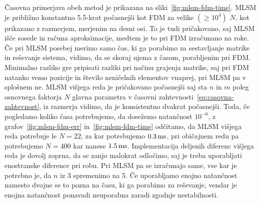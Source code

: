 \documentclass[a4paper,twoside]{article}
\theoremstyle{definition} %
\theoremstyle{plain} %
\numberwithin{equation}{section}
\begin{document}
Časovna primerjava obeh metod je prikazana na sliki~\ref{fig:mlsm-fdm-time}.
MLSM je približno konstantno 5.5-krat počasnejši kot FDM za velike $(\geq
10^4)$ $N$, kot prikazano z razmerjem, merjenim na desni osi. To je tudi
pričakovano, saj MLSM išče sosede in računa aproksimacije, medtem je to pri FDM
izračunano na roke.  Če pri MLSM posebej merimo samo čas, ki ga porabimo za
sestavljanje matrike in reševanje sistema, vidimo, da se skoraj ujema z časom,
porabljenim pri FDM.  Minimalno razliko gre pripisati razliki pri načinu
grajenja matrike, saj pri FDM natanko vemo pozicije in število neničelnih
elementov vnaprej, pri MLSM pa v splošnem ne. MLSM višjega reda je pričakovano
počasnejši saj sta $n$ in $m$ poleg osnovnega faktorja $N$ glavna parametra v
časovni zahtevnosti~\eqref{eq:casovna-zahtevnost}, iz razmerja vidimo, da je
konsistentno dvakrat počasnejši. Toda, če pogledamo koliko časa potrebujemo, da
dosežemo natančnost $10^{-6}$, z grafov~\ref{fig:mlsm-fdm-err}
in~\ref{fig:mlsm-fdm-time} odčitamo, da MLSM višjega reda potrebuje le $N = 22$,
za kar potrebujemo $\unit[0.3]{ms}$, pri običajnem redu pa potrebujemo
$N = 400$ kar nanese $\unit[1.5]{ms}$. Implementacija deljenih diferenc višjega
reda je dovolj zoprna, da se zanjo malokrat odločimo, saj je treba uporabljati
enostranske diference pri robu. Pri MLSM pa se izračunajo same, vse kar je
potrebno je, da $n$ iz 3 spremenimo na 5. Če uporabljamo enojno natančnost
namesto dvojne se to pozna na času, ki ga porabimo za reševanje, vendar je
enojna natančnost ponavadi neuporabna zaradi zgodnje nestabilnosti.

\end{document}
